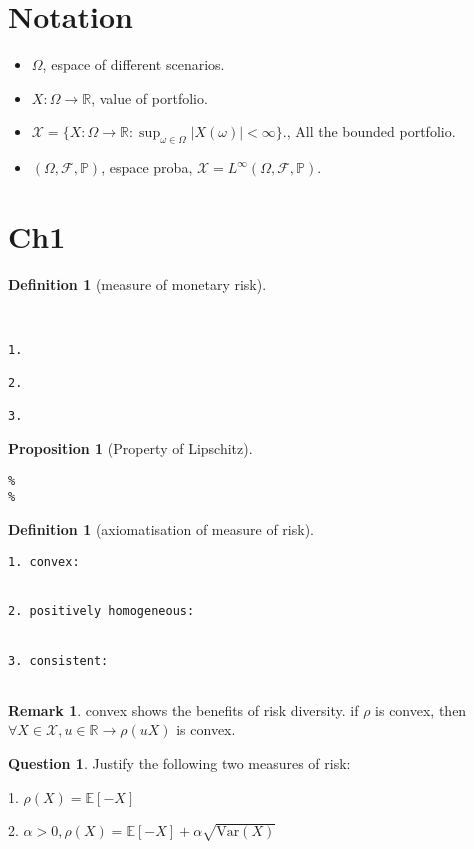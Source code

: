 \documentclass[letterpaper, 11pt]{article}
\let\mc\mathcal
\newcommand{\R}{\mathbb{R}}   %
\newcommand{\pr}{\mathbb{P}}    %
\newcommand{\E}{\mathbb{E}}     %
\newcommand{\var}{\text{Var}}   %
\newcommand{\1}{\mathds{1}}	%
\theoremstyle{definition}
\newtheorem{proposition}[theorem]{Proposition}
\newtheorem{definition}[theorem]{Definition}
\newtheorem{remark}[theorem]{Remark}
\newtheorem{question}[theorem]{Question}
\begin{document}
\section*{Notation}
\begin{itemize}
    \item $\Omega$, espace of different scenarios.
    \item $X:\Omega \rightarrow \R$, value of portfolio.
    \item $\mc{X}=\{X: \Omega \rightarrow \R: \sup_{\omega \in \Omega}|X(\omega)|<\infty \}.$, All the bounded portfolio.
    \item $(\Omega,\mc{F},\pr)$, espace proba, $\mc{X}=L^{\infty}(\Omega,\mc{F},\pr)$.
\end{itemize}


\section{Ch1}
\begin{definition}[measure of monetary risk]
\end{definition}
\begin{lstlisting}


1.

2.

3.

\end{lstlisting}

\begin{proposition}[Property of Lipschitz]
\end{proposition}
\begin{lstlisting}
%
%
\end{lstlisting}

\begin{definition}[axiomatisation of measure of risk]
\end{definition}
\begin{lstlisting}
1. convex:


2. positively homogeneous:


3. consistent:


\end{lstlisting}

\begin{remark}
    convex shows the benefits of risk diversity.
    if $\rho$ is convex, then $\forall X \in \mc{X}, u \in \R \rightarrow \rho(uX)$ is convex.
\end{remark}

\begin{question}
Justify the following two measures of risk:

1. $\rho(X) = \E[-X]$

2. $\alpha > 0, \rho(X)=\E[-X]+\alpha \sqrt{\var(X)}$
\end{question}
\end{document}
